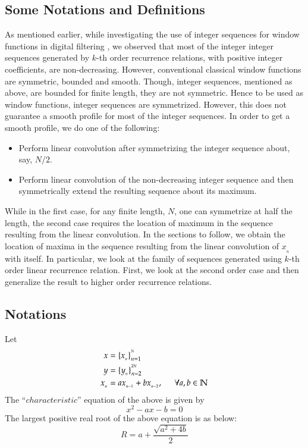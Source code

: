 \begin{multicols}{2}
\section{Some Notations and Definitions}\label{section-15}
As mentioned earlier, while investigating the use of integer sequences for window functions in digital filtering \cite{art1-key02}, we observed that most of the integer integer sequences generated by $k$-th order recurrence relations, with positive integer coefficients, are non-decreasing. However, conventional classical window functions are symmetric, bounded and smooth. Though, integer sequences, mentioned as above, are bounded for finite length, they are not symmetric. Hence to be used as window functions, integer sequences are symmetrized. However, this does not guarantee a smooth profile for most of the integer sequences. In order to get a smooth profile, we do one of the following:
\begin{itemize}
\item Perform linear convolution after symmetrizing the integer sequence about, say, $N/2$.
\item Perform linear convolution of the non-decreasing integer sequence and then symmetrically extend the resulting sequence about its maximum.
\end{itemize}
While in the first case, for any finite length, $N$, one can symmetrize at half the length, the second case requires the location of maximum in the sequence resulting from the linear convolution. In the sections to follow, we obtain the location of maxima in the sequence resulting from the linear convolution of $x_{_n}$ with itself. In particular, we look at the family of sequences generated using $k$-th order linear recurrence relation. First, we look at the second order case and then generalize the result to higher order recurrence relations.

\subsection{Notations}\label{subsection-15.1}
Let
\begin{align}
 x &= \{ x_{_n} \}_{n=1}^{^{N}}\label{eq-15.1}\\
 y &= \{y_{_n}\}_{n=2}^{^{2N}} \label{eq-15.2}\\
 x_{_n} &= ax_{_{n-1}} + bx_{_{n-2}}, \hspace{0.2in} \forall a,b \in \mathbb N \label{eq-15.3}
\end{align}
The ``$characteristic$'' equation of the above is given by
\begin{equation}
x^2 - ax - b = 0\label{eq-15.4}
\end{equation}
The largest positive real root of the above equation is as below:
\begin{equation}
R = a + \displaystyle{\frac{\sqrt{a^2+4b}}{2}}\label{eq-15.5}
\end{equation}
 

\end{multicols}
